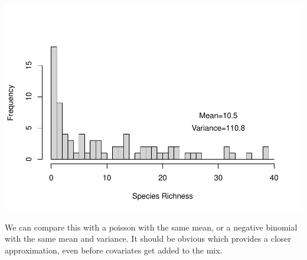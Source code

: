 \documentclass[
]{book}
\begin{document}
\includegraphics{ECOMODbook_files/figure-latex/unnamed-chunk-26-1.pdf}

We can compare this with a poisson with the same mean, or a negative binomial with the same mean and variance. It should be obvious which provides a closer approximation, even before covariates get added to the mix.
\end{document}
